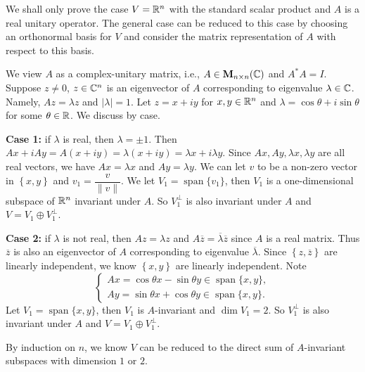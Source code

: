     \begin{proofenv}
        We shall only prove the case $V=\mathbb{R}^n$ with the standard scalar product and $A$ is a real unitary operator. The general case can be reduced to this case by choosing an orthonormal basis for $V$ and consider the matrix representation of $A$ with respect to this basis.

        We view $A$ as a complex-unitary matrix, i.e., $A\in \mathbf{M}_{n\times n}(\mathbb{C})$ and $A^* A = I$. Suppose $z\ne 0$, $z\in \mathbb{C}^n$ is an eigenvector of $A$ corresponding to eigenvalue $\lambda \in \mathbb{C}$. Namely, $A z = \lambda z$ and $|\lambda|=1$. Let $z = x + i y$ for $x,y\in \mathbb{R}^n$ and $\lambda = \cos\theta + i\sin \theta$ for some $\theta\in \mathbb{R}$. We discuss by case.

        \textbf{Case 1:} if $\lambda$ is real, then $\lambda = \pm 1$. Then $Ax + iAy = A(x+iy) = \lambda (x+iy) = \lambda x + i \lambda y$. Since $Ax, Ay, \lambda x, \lambda y$ are all real vectors, we have $Ax = \lambda x$ and $Ay = \lambda y$. We can let $v$ to be a non-zero vector in $\left\{ x,y \right\}$ and $v_1 = \dfrac{v}{\| v \|}$. We let $V_1 = \operatorname{span} \{ v_1 \}$, then $V_1$ is a one-dimensional subspace of $\mathbb{R}^n$ invariant under $A$. So $V_1^\perp$ is also invariant under $A$ and $V=V_1 \oplus V_1^\perp$.

        \textbf{Case 2:} if $\lambda$ is not real, then $A z = \lambda z$ and $A \overline{z} = \overline{\lambda} \overline{z}$ since $A$ is a real matrix. Thus $\overline{z}$ is also an eigenvector of $A$ corresponding to eigenvalue $\overline{\lambda}$. Since $\left\{ z,\overline{z} \right\}$ are linearly independent, we know $\left\{ x,y \right\}$ are linearly independent. Note
        $$\begin{cases}
            A x = \cos\theta x - \sin\theta y \in \operatorname{span}\{x,y\},\\
            A y = \sin\theta x + \cos\theta y \in \operatorname{span}\{x,y\}.
        \end{cases}
        $$
        Let $V_1 = \operatorname{span} \{ x,y \}$, then $V_1$ is $A$-invariant and $\dim V_1 = 2$. So $V_1^\perp$ is also invariant under $A$ and $V=V_1 \oplus V_1^\perp$.

        By induction on $n$, we know $V$ can be reduced to the direct sum of $A$-invariant subspaces with dimension $1$ or $2$.
    \end{proofenv}
